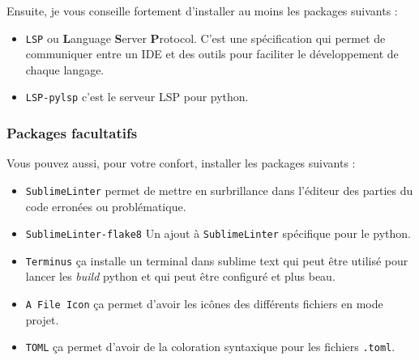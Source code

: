 \documentclass[a4paper,12pt]{article}
\begin{document}
Ensuite, je vous conseille fortement d'installer au moins les packages suivants :
\begin{itemize}
    \item \texttt{LSP} ou \textbf{L}anguage \textbf{S}erver \textbf{P}rotocol. C'est une spécification qui permet de communiquer entre un IDE et des outils pour faciliter le développement de chaque langage.
    \item \texttt{LSP-pylsp} c'est le serveur LSP pour python. 
\end{itemize}



\subsubsection{Packages facultatifs}

Vous pouvez aussi, pour votre confort, installer les packages suivants :
\begin{itemize}
    \item \texttt{SublimeLinter} permet de mettre en surbrillance dans l'éditeur des parties du code erronées ou problématique.
    \item \texttt{SublimeLinter-flake8} Un ajout à \texttt{SublimeLinter} spécifique pour le python.
    \item \texttt{Terminus} ça installe un terminal dans sublime text qui peut être utilisé pour lancer les \textit{build} python et qui peut être configuré et plus beau.
    \item \texttt{A File Icon} ça permet d'avoir les icônes des différents fichiers en mode projet.
    \item \texttt{TOML} ça permet d'avoir de la coloration syntaxique pour les fichiers \texttt{.toml}.
\end{itemize}

\end{document}
